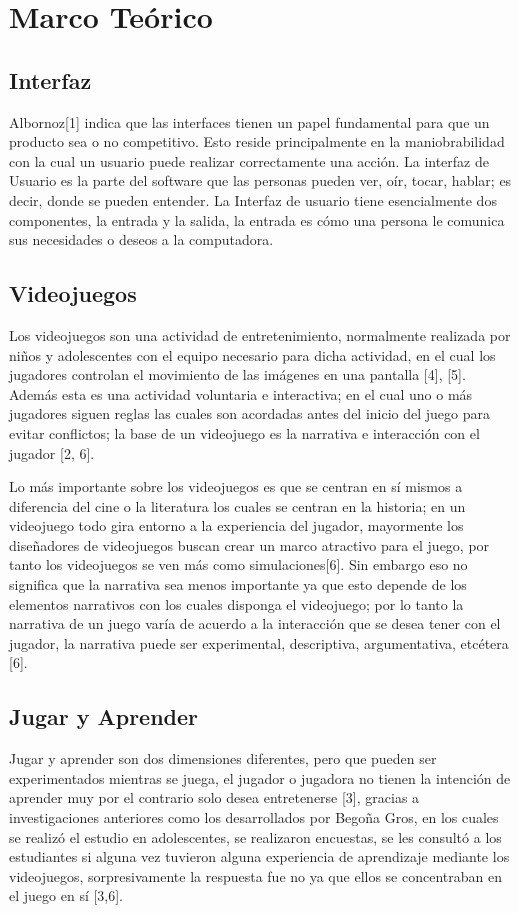 \documentclass[conference, letterpaper]{IEEEtran}
\begin{document}
\section{Marco Teórico}
\subsection{Interfaz}
Albornoz[1] indica que las interfaces tienen un papel fundamental para que un producto sea o no competitivo. Esto reside principalmente en la maniobrabilidad con la cual un usuario puede realizar correctamente una acción. La interfaz de Usuario es la parte del software que las personas pueden ver, oír, tocar, hablar; es decir, donde se pueden entender. La Interfaz de usuario tiene esencialmente dos componentes, la entrada y la salida, la entrada es cómo una persona le comunica sus necesidades o deseos a la computadora.
\subsection{Videojuegos}
Los videojuegos son una actividad de entretenimiento, normalmente realizada por niños y adolescentes con el equipo necesario para dicha actividad, en el cual los jugadores controlan el movimiento de las imágenes en una pantalla [4], [5]. Además esta es una actividad voluntaria e interactiva; en el cual uno o más jugadores siguen reglas las cuales son acordadas antes del inicio del juego para evitar conflictos; la base de un videojuego es la narrativa e interacción con el jugador [2, 6].

Lo más importante sobre los videojuegos es que se centran en sí mismos a diferencia del cine o la literatura los cuales se centran en la historia; en un videojuego todo gira entorno a la experiencia del jugador, mayormente los diseñadores de videojuegos buscan crear un marco atractivo para el juego, por tanto los videojuegos se ven más como simulaciones[6]. Sin embargo eso no significa que la narrativa sea menos importante ya que esto depende de los elementos narrativos con los cuales disponga el videojuego; por lo tanto la narrativa de un juego varía de acuerdo a la interacción que se desea tener con el jugador, la narrativa puede ser experimental, descriptiva, argumentativa, etcétera [6].
\subsection{Jugar y Aprender}
Jugar y aprender son dos dimensiones diferentes, pero que pueden ser experimentados mientras se juega, el jugador o jugadora no tienen la intención de aprender muy por el contrario solo desea entretenerse [3], gracias a investigaciones anteriores como los desarrollados por Begoña Gros, en los cuales se realizó el estudio en adolescentes, se realizaron encuestas, se les consultó a los estudiantes si alguna vez tuvieron alguna experiencia de aprendizaje mediante los videojuegos, sorpresivamente la respuesta fue no ya que ellos se concentraban en el juego en sí [3,6].
\end{document}

